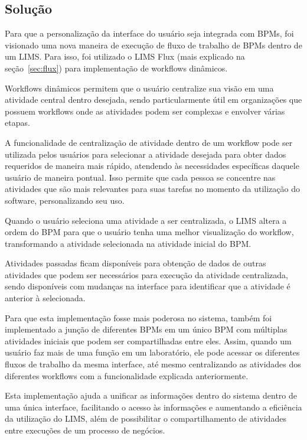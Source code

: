 \subsection{Solução}


Para que a personalização da interface do usuário seja integrada com BPMs, foi visionado uma nova maneira de execução de fluxo de trabalho de BPMs dentro de um LIMS. Para isso, foi utilizado o LIMS Flux (mais explicado na seção~\ref{sec:flux}) para implementação de workflows dinâmicos.

Workflows dinâmicos permitem que o usuário centralize sua visão em uma atividade central dentro desejada, sendo particularmente útil em organizações que possuem workflows onde as atividades podem ser complexas e envolver várias etapas.


A funcionalidade de centralização de atividade dentro de um workflow pode ser utilizada pelos usuários para selecionar a atividade desejada para obter dados requeridos de maneira mais rápido, atendendo às necessidades específicas daquele usuário de maneira pontual. Isso permite que cada pessoa se concentre nas atividades que são mais relevantes para suas tarefas no momento da utilização do software, personalizando seu uso.

Quando o usuário seleciona uma atividade a ser centralizada, o LIMS altera a ordem do BPM para que o usuário tenha uma melhor visualização do workflow, transformando a atividade selecionada na atividade inicial do BPM.

Atividades passadas ficam disponíveis para obtenção de dados de outras atividades que podem ser necessários para execução da atividade centralizada, sendo disponíveis com mudanças na interface para identificar que a atividade é anterior à selecionada.


Para que esta implementação fosse mais poderosa no sistema, também foi implementado a junção de diferentes BPMs em um único BPM com múltiplas atividades iniciais que podem ser compartilhadas entre eles. Assim, quando um usuário faz mais de uma função em um laboratório, ele pode acessar os diferentes fluxos de trabalho da mesma interface, até mesmo centralizando as atividades dos diferentes workflows com a funcionalidade explicada anteriormente.

Esta implementação ajuda a unificar as informações dentro do sistema dentro de uma única interface, facilitando o acesso às informações e aumentando a eficiência da utilização do LIMS, além de possibilitar o compartilhamento de atividades entre execuções de um processo de negócios.



